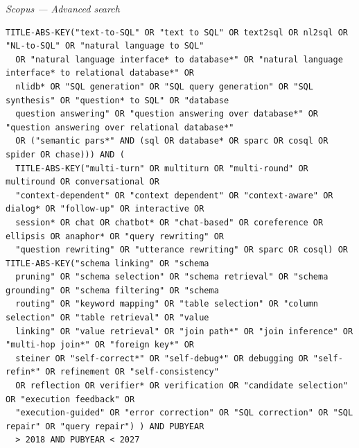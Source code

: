 \par\medskip\noindent\textit{Scopus — Advanced search}\par\nopagebreak
\begin{lstlisting}
TITLE-ABS-KEY("text-to-SQL" OR "text to SQL" OR text2sql OR nl2sql OR "NL-to-SQL" OR "natural language to SQL"
  OR "natural language interface* to database*" OR "natural language interface* to relational database*" OR
  nlidb* OR "SQL generation" OR "SQL query generation" OR "SQL synthesis" OR "question* to SQL" OR "database
  question answering" OR "question answering over database*" OR "question answering over relational database*"
  OR ("semantic pars*" AND (sql OR database* OR sparc OR cosql OR spider OR chase))) AND (
  TITLE-ABS-KEY("multi-turn" OR multiturn OR "multi-round" OR multiround OR conversational OR
  "context-dependent" OR "context dependent" OR "context-aware" OR dialog* OR "follow-up" OR interactive OR
  session* OR chat OR chatbot* OR "chat-based" OR coreference OR ellipsis OR anaphor* OR "query rewriting" OR
  "question rewriting" OR "utterance rewriting" OR sparc OR cosql) OR TITLE-ABS-KEY("schema linking" OR "schema
  pruning" OR "schema selection" OR "schema retrieval" OR "schema grounding" OR "schema filtering" OR "schema
  routing" OR "keyword mapping" OR "table selection" OR "column selection" OR "table retrieval" OR "value
  linking" OR "value retrieval" OR "join path*" OR "join inference" OR "multi-hop join*" OR "foreign key*" OR
  steiner OR "self-correct*" OR "self-debug*" OR debugging OR "self-refin*" OR refinement OR "self-consistency"
  OR reflection OR verifier* OR verification OR "candidate selection" OR "execution feedback" OR
  "execution-guided" OR "error correction" OR "SQL correction" OR "SQL repair" OR "query repair") ) AND PUBYEAR
  > 2018 AND PUBYEAR < 2027
\end{lstlisting}

